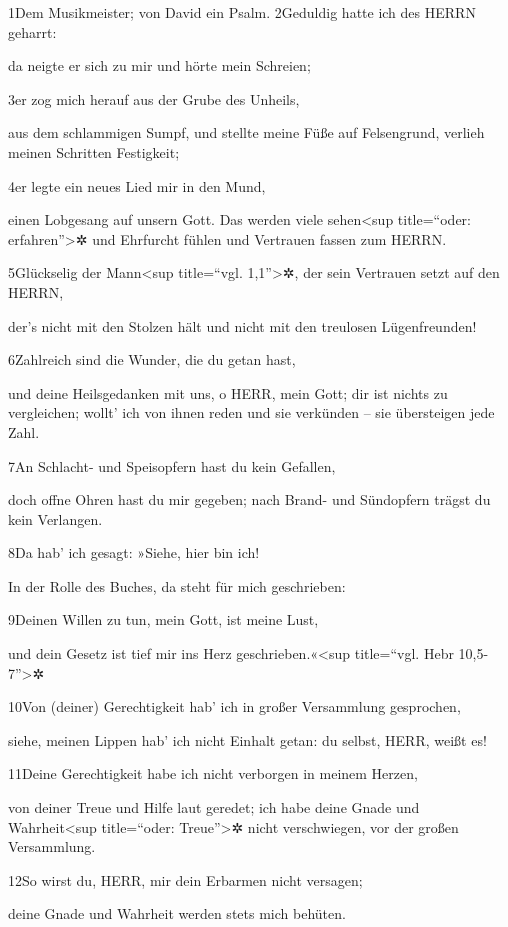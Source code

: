 1Dem Musikmeister; von David ein Psalm. 2Geduldig hatte ich des HERRN
geharrt:

da neigte er sich zu mir und hörte mein Schreien;

3er zog mich herauf aus der Grube des Unheils,

aus dem schlammigen Sumpf, und stellte meine Füße auf Felsengrund,
verlieh meinen Schritten Festigkeit;

4er legte ein neues Lied mir in den Mund,

einen Lobgesang auf unsern Gott. Das werden viele sehen\textless sup
title=``oder: erfahren''\textgreater✲ und Ehrfurcht fühlen und Vertrauen
fassen zum HERRN.

5Glückselig der Mann\textless sup title=``vgl. 1,1''\textgreater✲, der
sein Vertrauen setzt auf den HERRN,

der's nicht mit den Stolzen hält und nicht mit den treulosen
Lügenfreunden!

6Zahlreich sind die Wunder, die du getan hast,

und deine Heilsgedanken mit uns, o HERR, mein Gott; dir ist nichts zu
vergleichen; wollt' ich von ihnen reden und sie verkünden -- sie
übersteigen jede Zahl.

7An Schlacht- und Speisopfern hast du kein Gefallen,

doch offne Ohren hast du mir gegeben; nach Brand- und Sündopfern trägst
du kein Verlangen.

8Da hab' ich gesagt: »Siehe, hier bin ich!

In der Rolle des Buches, da steht für mich geschrieben:

9Deinen Willen zu tun, mein Gott, ist meine Lust,

und dein Gesetz ist tief mir ins Herz geschrieben.«\textless sup
title=``vgl. Hebr 10,5-7''\textgreater✲

10Von (deiner) Gerechtigkeit hab' ich in großer Versammlung gesprochen,

siehe, meinen Lippen hab' ich nicht Einhalt getan: du selbst, HERR,
weißt es!

11Deine Gerechtigkeit habe ich nicht verborgen in meinem Herzen,

von deiner Treue und Hilfe laut geredet; ich habe deine Gnade und
Wahrheit\textless sup title=``oder: Treue''\textgreater✲ nicht
verschwiegen, vor der großen Versammlung.

12So wirst du, HERR, mir dein Erbarmen nicht versagen;

deine Gnade und Wahrheit werden stets mich behüten.

